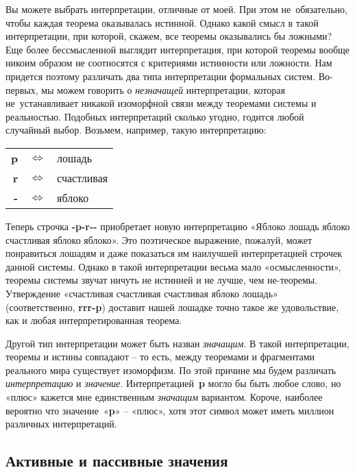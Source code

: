 \documentclass[../main.tex]{subfiles}
\begin{document}
Вы можете выбрать интерпретации, отличные от моей. При этом не~обязательно, чтобы каждая теорема оказывалась истинной. Однако какой смысл в такой интерпретации, при которой, скажем, все теоремы оказывались бы ложными? Еще более бессмысленной выглядит интерпретация, при которой теоремы вообще никоим образом не соотносятся с критериями истинности или ложности. Нам придется поэтому различать два типа интерпретации формальных систем. Во-первых, мы можем говорить о \emph{незначащей} интерпретации, которая не~устанавливает никакой изоморфной связи между теоремами системы и реальностью. Подобных интерпретаций сколько угодно, годится любой случайный выбор. Возьмем, например, такую интерпретацию:
\begin{center}
    \setlength{\tabcolsep}{4pt}
    \begin{tabular}{r c l}
        \textbf{p} & $\Longleftrightarrow$ & лошадь \\
        \textbf{r} & $\Longleftrightarrow$ & счастливая \\
        \textbf{-} & $\Longleftrightarrow$ & яблоко \\
    \end{tabular}
\end{center}

Теперь строчка \textbf{-p-r-{}-} приобретает новую интерпретацию «Яблоко лошадь яблоко счастливая яблоко яблоко». Это поэтическое выражение, пожалуй, может понравиться лошадям и даже показаться им наилучшей интерпретацией строчек данной системы. Однако в такой интерпретации весьма мало «осмысленности», теоремы системы звучат ничуть не истинней и не лучше, чем не-теоремы. Утверждение «счастливая счастливая счастливая яблоко лошадь» (соответственно, \textbf{rrr-p}) доставит нашей лошадке точно такое же удовольствие, как и любая интерпретированная теорема.

Другой тип интерпретации может быть назван \emph{значащим}. В такой интерпретации, теоремы и истины совпадают \--- то есть, между теоремами и фрагментами реального мира существует изоморфизм. По этой причине мы будем различать \emph{интерпретацию} и \emph{значение}. Интерпретацией~\textbf{p} могло бы быть любое слово, но «плюс» кажется мне единственным \emph{значащим} вариантом. Короче, наиболее вероятно что значение~«\textbf{p}» \--- «плюс», хотя этот символ может иметь миллион различных интерпретаций.


\subsection{Активные и пассивные значения}
\end{document}
